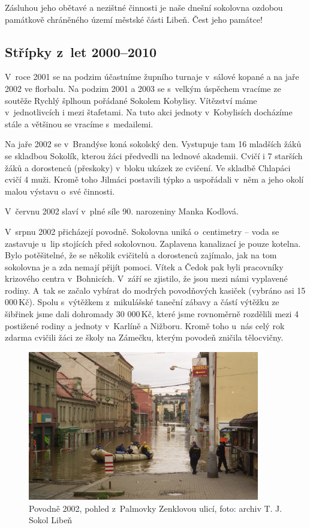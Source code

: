 \documentclass[a5paper, 11pt, twoside]{article}
\begin{document}
Zásluhou jeho obětavé a nezištné činnosti je naše dnešní sokolovna
ozdobou památkově chráněného území městské části Libeň. Čest jeho
památce!

\subsection{Střípky z~let
2000--2010}

V~roce 2001 se na podzim účastníme župního turnaje v~sálové kopané a na
jaře 2002 ve florbalu. Na podzim 2001 a 2003 se s~velkým úspěchem
vracíme ze soutěže Rychlý šplhoun pořádané Sokolem Kobylisy. Vítězství
máme v~jednotlivcích i mezi štafetami. Na tuto akci jednoty v~Kobylisích
docházíme stále a většinou se vracíme s~medailemi.

Na jaře 2002 se v~Brandýse koná sokolský den. Vystupuje tam 16 mladších
žáků se skladbou Sokolík, kterou žáci předvedli na lednové akademii.
Cvičí i 7 starších žáků a dorostenců (přeskoky) v~bloku ukázek ze
cvičení. Ve skladbě Chlapáci cvičí 4 muži. Kromě toho Jilmáci postavili
týpko a uspořádali v~něm a jeho okolí malou výstavu o~své činnosti.

V~červnu 2002 slaví v~plné síle 90. narozeniny Manka Kodlová.

V~srpnu 2002 přicházejí povodně. Sokolovna uniká o~centimetry -- voda se
zastavuje u~lip stojících před sokolovnou. Zaplavena kanalizací je pouze
kotelna. Bylo potěšitelné, že se několik cvičitelů a dorostenců
zajímalo, jak na tom sokolovna je a zda nemají přijít pomoci. Vítek a
Čedok pak byli pracovníky krizového centra v~Bohnicích. V~září se
zjistilo, že jsou mezi námi vyplavené rodiny. A~tak se začalo vybírat do
modrých povodňových kasiček (vybráno asi 15 000\,Kč). Spolu s~výtěžkem
z~mikulášské taneční zábavy a částí výtěžku ze šibřinek jsme dali
dohromady 30 000\,Kč, které jsme rovnoměrně rozdělili mezi 4 postižené
rodiny a jednoty v~Karlíně a Nižboru. Kromě toho u~nás celý rok zdarma
cvičili žáci ze školy na Zámečku, kterým povodeň zničila tělocvičny.

\begin{figure}[h!]
  \centering 
  \includegraphics[width=0.9\textwidth]{img/47_povodne.jpg}
  \caption*{Povodně 2002, pohled z~Palmovky Zenklovou ulicí, foto: archiv T.
  J. Sokol Libeň}
\end{figure}
\end{document}
